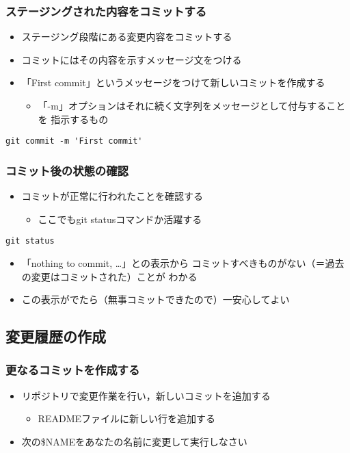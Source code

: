 \documentclass[a4paper,twoside,twocolumn]{bxjsarticle}
\begin{document}
\subsubsection{ステージングされた内容をコミットする}
\label{sec-1-3-7}
\begin{itemize}
\item ステージング段階にある変更内容をコミットする
\item コミットにはその内容を示すメッセージ文をつける
\item 「First commit」というメッセージをつけて新しいコミットを作成する
\begin{itemize}
\item 「-m」オプションはそれに続く文字列をメッセージとして付与することを
指示するもの
\end{itemize}
\end{itemize}

\begin{verbatim}
git commit -m 'First commit'
\end{verbatim}

\subsubsection{コミット後の状態の確認}
\label{sec-1-3-8}
\begin{itemize}
\item コミットが正常に行われたことを確認する
\begin{itemize}
\item ここでもgit statusコマンドか活躍する
\end{itemize}
\end{itemize}

\begin{verbatim}
git status
\end{verbatim}

\begin{itemize}
\item 「nothing to commit, \ldots{}」との表示から
コミットすべきものがない（＝過去の変更はコミットされた）ことが
わかる
\item この表示がでたら（無事コミットできたので）一安心してよい
\end{itemize}

\subsection{変更履歴の作成}
\label{sec-1-4}
\subsubsection{更なるコミットを作成する}
\label{sec-1-4-1}
\begin{itemize}
\item リポジトリで変更作業を行い，新しいコミットを追加する
\begin{itemize}
\item READMEファイルに新しい行を追加する
\end{itemize}
\item 次の\$NAMEをあなたの名前に変更して実行しなさい
\end{itemize}
\end{document}
